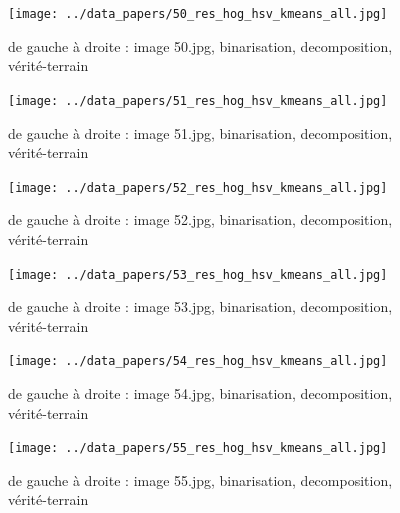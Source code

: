 \documentclass{book}
\begin{document}
\begin{figure}[H]
\begin{center}
\texttt{[image: ../data\_papers/50\_res\_hog\_hsv\_kmeans\_all.jpg]}
\end{center}
\caption{de gauche à droite : image 50.jpg, binarisation, decomposition, vérité-terrain}
\label{50}
\end{figure}
\clearpage


\begin{figure}[H]
\begin{center}
\texttt{[image: ../data\_papers/51\_res\_hog\_hsv\_kmeans\_all.jpg]}
\end{center}
\caption{de gauche à droite : image 51.jpg, binarisation, decomposition, vérité-terrain}
\label{51}
\end{figure}
\clearpage


\begin{figure}[H]
\begin{center}
\texttt{[image: ../data\_papers/52\_res\_hog\_hsv\_kmeans\_all.jpg]}
\end{center}
\caption{de gauche à droite : image 52.jpg, binarisation, decomposition, vérité-terrain}
\label{52}
\end{figure}
\clearpage


\begin{figure}[H]
\begin{center}
\texttt{[image: ../data\_papers/53\_res\_hog\_hsv\_kmeans\_all.jpg]}
\end{center}
\caption{de gauche à droite : image 53.jpg, binarisation, decomposition, vérité-terrain}
\label{53}
\end{figure}
\clearpage


\begin{figure}[H]
\begin{center}
\texttt{[image: ../data\_papers/54\_res\_hog\_hsv\_kmeans\_all.jpg]}
\end{center}
\caption{de gauche à droite : image 54.jpg, binarisation, decomposition, vérité-terrain}
\label{54}
\end{figure}
\clearpage


\begin{figure}[H]
\begin{center}
\texttt{[image: ../data\_papers/55\_res\_hog\_hsv\_kmeans\_all.jpg]}
\end{center}
\caption{de gauche à droite : image 55.jpg, binarisation, decomposition, vérité-terrain}
\label{55}
\end{figure}
\clearpage
\end{document}
